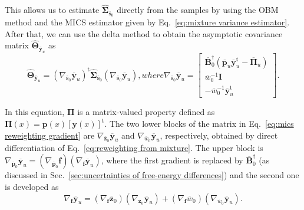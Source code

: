 \documentclass[journal=jctcce,manuscript=article,layout=twocolumn]{achemso}
\newcommand{\mt}[1]{\boldsymbol{\mathbf{#1}}}   %
\newcommand{\vt}[1]{\boldsymbol{\mathbf{#1}}}   %
\newcommand{\tr}[1]{#1^\text{t}}                %
\begin{document}
This allows us to estimate $\hat{\mt \Sigma}_{\overline{\vt s}_0}$ directly from the samples by using the OBM method and the MICS estimator given by Eq.~\eqref{eq:mixture variance estimator}. After that, we can use the delta method to obtain the asymptotic covariance matrix $\hat{\mt \Theta}_{\overline{\vt y}_u}$ as
\begin{subequations}
\label{eq:mics reweighting}
\begin{equation}
\label{eq:mics reweighting delta method}
\hat{\mt \Theta}_{\overline{\vt y}_u} = \tr{(\nabla_{\overline{\vt s}_0} {\overline{\vt y}_u})} \hat{\mt \Sigma}_{\overline{\vt s}_0} (\nabla_{\overline{\vt s}_0} {\overline{\vt y}_u}),
\end{equation}
where
\begin{equation}
\label{eq:mics reweighting gradient}
\nabla_{\overline{\vt s}_0} {\overline{\vt y}_u} = \left[\begin{array}{c}
\overline{\mt B}_0^\dag (\overline{\vt p}_u \tr{\overline{\vt y}}_u - \overline{\mt \Pi}_u) \\
\overline{w}_0^{-1} {\mt I} \\
-\overline{w}_0^{-1} \tr{\overline{\vt y}}_u
\end{array}\right].
\end{equation}
\end{subequations}

In this equation, $\mt \Pi$ is a matrix-valued property defined as $\mt \Pi(x) = \vt p(x) \tr{[\vt y(x)]}$. The two lower blocks of the matrix in Eq.~\eqref{eq:mics reweighting gradient} are $\nabla_{\overline{\vt z}_0} {\overline{\vt y}_u}$ and $\nabla_{\overline{w}_0} {\overline{\vt y}_u}$, respectively, obtained by direct differentiation of Eq.~\eqref{eq:reweighting from mixture}. The upper block is $\nabla_{\overline{\vt p}_0} {\overline{\vt y}_u}  = (\nabla_{\overline{\vt p}_0} {\vt f})(\nabla_{\vt f} {\overline{\vt y}_u})$, where the first gradient is replaced by $\overline{\mt B}_0^\dag$ (as discussed in Sec.~\ref{sec:uncertainties of free-energy differences}) and the second one is developed as
\begin{equation*}
\nabla_{\vt f} {\overline{\vt y}_u} = (\nabla_{\vt f} {\overline{\vt z}_0}) (\nabla_{\overline{\vt z}_0} {\overline{\vt y}_u}) + (\nabla_{\vt f} {\overline{w}_0}) (\nabla_{\overline{w}_0} {\overline{\vt y}_u}).
\end{equation*}
\end{document}
